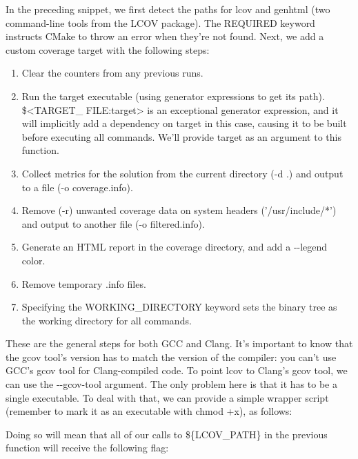 In the preceding snippet, we first detect the paths for lcov and genhtml (two command-line tools from the LCOV package). The REQUIRED keyword instructs CMake to throw an error when they’re not found. Next, we add a custom coverage target with the following steps:

\begin{enumerate}
\item
Clear the counters from any previous runs.

\item
Run the target executable (using generator expressions to get its path). \$<TARGET\_ FILE:target> is an exceptional generator expression, and it will implicitly add a dependency on target in this case, causing it to be built before executing all commands. We’ll provide target as an argument to this function.

\item
Collect metrics for the solution from the current directory (-d .) and output to a file (-o coverage.info).

\item
Remove (-r) unwanted coverage data on system headers ('/usr/include/*') and output to another file (-o filtered.info).

\item
Generate an HTML report in the coverage directory, and add a -{}-legend color.

\item
Remove temporary .info files.

\item
Specifying the WORKING\_DIRECTORY keyword sets the binary tree as the working directory for all commands.
\end{enumerate}

These are the general steps for both GCC and Clang. It’s important to know that the gcov tool’s version has to match the version of the compiler: you can’t use GCC’s gcov tool for Clang-compiled code. To point lcov to Clang’s gcov tool, we can use the -{}-gcov-tool argument. The only problem here is that it has to be a single executable. To deal with that, we can provide a simple wrapper script (remember to mark it as an executable with chmod +x), as follows:


Doing so will mean that all of our calls to \$\{LCOV\_PATH\} in the previous function will receive the following flag:


